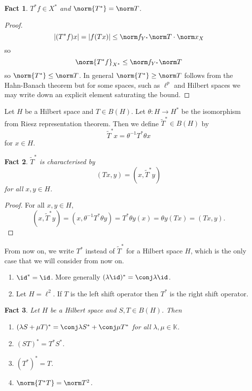 \documentclass[a4paper]{article}
\newtheorem*{fact}{Fact}
\newcommand{\K}{{\mathbb{K}}} %
\begin{document}
\begin{fact}
  \(T^*f \in X^*\) and \(\norm{T^*} = \norm T\).
\end{fact}

\begin{proof}
  \[
    |(T^*f)x| = |f(Tx)| \leq \norm f_{Y^*} \norm T \cdot \norm x_X
  \]
  so
  \[
    \norm{T^*f}_{X^*} \leq \norm f_{Y^*} \norm T
  \]
  so \(\norm{T^*} \leq \norm T\). In general \(\norm{T^*} \geq \norm T\) follows from the Hahn-Banach theorem but for some spaces, such as \(\ell^p\) and Hilbert spaces we may write down an explicit element saturating the bound.
\end{proof}

\begin{definition}
  Let \(H\) be a Hilbert space and \(T \in B(H)\). Let \(\theta: H \to H^*\) be the isomorphism from Riesz representation theorem. Then we define \(\tilde T^* \in B(H)\) by
  \[
    \tilde T^* x = \theta^{-1}T^* \theta x
  \]
  for \(x \in H\).
\end{definition}

\begin{fact}
  \(\tilde T^*\) is characterised by
  \[
    (Tx, y) = (x, \tilde T^* y)
  \]
  for all \(x, y \in H\).
\end{fact}

\begin{proof}
  For all \(x, y \in H\),
  \[
    (x, \tilde T^*y)
    = (x, \theta^{-1} T^* \theta y)
    = T^*\theta y(x)
    = \theta y(Tx)
    = (Tx, y).
  \]
\end{proof}

From now on, we write \(T^*\) instead of \(\tilde T^*\) for a Hilbert space \(H\), which is the only case that we will consider from now on.

\begin{eg}\leavevmode
  \begin{enumerate}
  \item \(\id^* = \id\). More generally \((\lambda \id)^* = \conj \lambda \id\).
  \item Let \(H = \ell^2\). If \(T\) is the left shift operator then \(T^*\) is the right shift operator.
  \end{enumerate}
\end{eg}

\begin{fact}
  Let \(H\) be a Hilbert space and \(S, T \in B(H)\). Then
  \begin{enumerate}
  \item \((\lambda S + \mu T)^* = \conj \lambda S^* + \conj \mu T^*\) for all \(\lambda, \mu \in \K\).
  \item \((ST)^* = T^*S^*\).
  \item \((T^*)^* = T\).
  \item \(\norm{T^* T} = \norm T^2\).
  \end{enumerate}
\end{fact}
\end{document}
